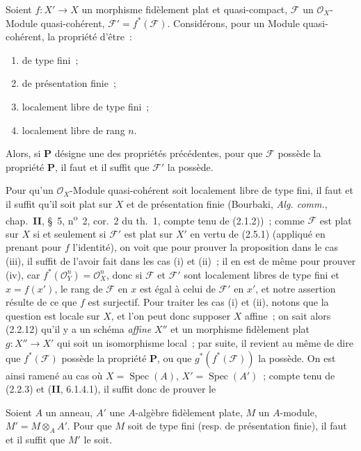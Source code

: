 \begin{proposition}[2.5.2]
Soient $f:X'\to X$ un morphisme fidèlement plat et quasi-compact,
$\mathscr F$ un $\mathcal O_X$-Module quasi-cohérent,
$\mathscr F'=f^*(\mathscr F)$. Considérons, pour un Module quasi-cohérent, la
propriété d'être~:
\begin{enumerate}
\item[\textup{(i)}] de type fini~;
\item[\textup{(ii)}] de présentation finie~;
\item[\textup{(iii)}] localement libre de type fini~;
\item[\textup{(iv)}] localement libre de rang $n$.
\end{enumerate}
Alors, si $\boldsymbol{P}$ désigne une des propriétés précédentes, pour que
$\mathscr F$ possède la propriété $\boldsymbol{P}$, il faut et il suffit que
$\mathscr F'$ la possède.
\end{proposition}

Pour qu'un $\mathcal O_X$-Module quasi-cohérent soit localement libre de type
fini, il faut et il suffit qu'il soit plat sur $X$ et de présentation finie
(Bourbaki, \emph{Alg. comm.}, chap.~\textbf{II}, \S~5, n\textsuperscript{o}~2,
cor.~2 du th.~1, compte tenu de (2.1.2))~; comme $\mathscr F$ est plat sur
$X$ si et seulement si $\mathscr F'$ est plat sur $X'$ en vertu de (2.5.1)
(appliqué en prenant pour $f$ l'identité), on voit que pour prouver la
proposition dans le cas (iii), il suffit de l'avoir fait dans les cas (i) et
(ii)~; il en est de même pour prouver (iv), car
$f^*(\mathcal O_Y^n)=\mathcal O_X^n$, donc si $\mathscr F$ et
$\mathscr F'$ sont localement libres de type fini et $x=f(x')$, le rang de
$\mathscr F$ en $x$ est égal à celui de $\mathscr F'$ en $x'$, et notre
assertion résulte de ce que $f$ est surjectif. Pour traiter les cas (i) et
(ii),
notons que la question est locale sur $X$, et l'on peut donc supposer $X$
affine~; on sait alors (2.2.12) qu'il y a un schéma \emph{affine} $X''$ et un
morphisme fidèlement plat $g:X''\to X'$ qui soit un isomorphisme local~; par
suite, il revient au même de dire que $f^*(\mathscr F)$ possède la propriété
$\boldsymbol{P}$, ou que $g^*(f^*(\mathscr F))$ la possède. On est ainsi ramené au
cas où $X=\operatorname{Spec}(A)$, $X'=\operatorname{Spec}(A')$~; compte tenu
de (2.2.3) et (\textbf{II}, 6.1.4.1), il suffit donc de prouver le

\begin{lemma}[2.5.3]
\label{IV.2.5.3-fr}
Soient $A$ un anneau, $A'$ une $A$-algèbre fidèlement plate, $M$ un
$A$-module, $M'=M\otimes_A A'$. Pour que $M$ soit de type fini \textup{(resp.} de
présentation finie), il faut et il suffit que $M'$ le soit.
\end{lemma}

